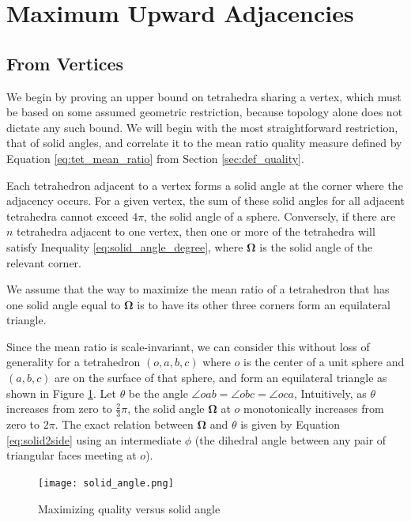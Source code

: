 \section{Maximum Upward Adjacencies}

\subsection{From Vertices}
\label{app:vert_up_deg}

We begin by proving an upper bound on tetrahedra sharing a vertex,
which must be based on some assumed geometric restriction,
because topology alone does not dictate any such bound.
We will begin with the most straightforward restriction, that
of solid angles, and correlate it to the mean ratio quality measure
defined by Equation \ref{eq:tet_mean_ratio} from Section \ref{sec:def_quality}.

Each tetrahedron adjacent to a vertex forms a solid angle at
the corner where the adjacency occurs.
For a given vertex, the sum of these solid angles for all
adjacent tetrahedra cannot exceed $4\pi$, the solid angle of a sphere.
Conversely, if there are $n$ tetrahedra adjacent to one vertex,
then one or more of the tetrahedra will satisfy Inequality
\ref{eq:solid_angle_degree}, where $\mathbf{\Omega}$ is the
solid angle of the relevant corner.

We assume that the way to maximize the mean ratio of a tetrahedron
that has one solid angle equal to $\mathbf{\Omega}$ is to have
its other three corners form an equilateral triangle.

Since the mean ratio is scale-invariant, we can consider this
without loss of generality for a tetrahedron $(o,a,b,c)$ where
$o$ is the center of a unit sphere and $(a,b,c)$ are on the surface
of that sphere, and form an equilateral triangle
as shown in Figure \ref{fig:solid_angle}.
Let $\theta$ be the angle $\angle oab = \angle obc = \angle oca$,
Intuitively, as $\theta$ increases from zero to $\frac23\pi$,
the solid angle $\mathbf{\Omega}$ at $o$ monotonically
increases from zero to $2\pi$.
The exact relation between $\mathbf{\Omega}$ and $\theta$ is given by Equation
\ref{eq:solid2side}
using an intermediate $\phi$ (the dihedral angle between any pair of triangular
faces meeting at $o$).

\begin{figure}
\begin{center}
\texttt{[image: solid\_angle.png]}
\caption{Maximizing quality versus solid angle}
\label{fig:solid_angle}
\end{center}
\end{figure}

